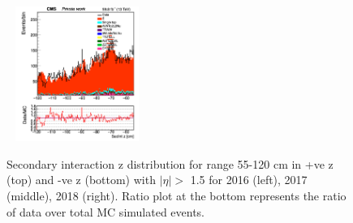 \documentclass{cernatlasnote}
\begin{document}
\begin{figure}[htp]
 \includegraphics[width=4.6cm, height=4.4cm]{images/emu_channel/2018/18_Plots_for_r_z/SecInt_z_Selec_eta_minus_z_55_120_Linear.png}\\
 \caption{Secondary interaction z distribution for range 55-120 cm in +ve z (top) and -ve z (bottom) with $|\eta|>$ 1.5 for 2016 (left), 2017 (middle), 2018 (right). Ratio plot at the bottom represents the ratio of data over total MC simulated events.}
 \label{fig:L0DATAMC}
  \end{figure}
\end{document}
